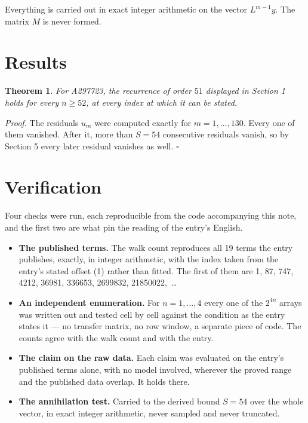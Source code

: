 \documentclass[11pt]{article}
\newtheorem{theorem}{Theorem}
\theoremstyle{definition}
\begin{document}
Everything is carried out in exact integer arithmetic on the vector $L^{m-1}y$. The matrix $M$ is never formed.

\section{Results}

\begin{theorem} For A297723, the recurrence of order $51$ displayed in Section 1 holds for every $n \ge 52$, at every index at which it can be stated.\end{theorem}

{\itshape Proof.} The residuals $u_m$ were computed exactly for $m = 1,\dots,130$. Every one of them vanished. After it, more than $S = 54$ consecutive residuals vanish, so by Section 5 every later residual vanishes as well. $\square$

\section{Verification}

Four checks were run, each reproducible from the code accompanying this note, and the first two are what pin the reading of the entry's English.

\begin{itemize}

\item {\bfseries The published terms.} The walk count reproduces all 19 terms the entry publishes, exactly, in integer arithmetic, with the index taken from the entry's stated offset (1) rather than fitted. The first of them are 1, 87, 747, 4212, 36981, 336653, 2699832, 21850022,~\dots

\item {\bfseries An independent enumeration.} For $n = 1,\dots,4$ every one of the $2^{4n}$ arrays was written out and tested cell by cell against the condition as the entry states it --- no transfer matrix, no row window, a separate piece of code. The counts agree with the walk count and with the entry.

\item {\bfseries The claim on the raw data.} Each claim was evaluated on the entry's published terms alone, with no model involved, wherever the proved range and the published data overlap. It holds there.

\item {\bfseries The annihilation test.} Carried to the derived bound $S = 54$ over the whole vector, in exact integer arithmetic, never sampled and never truncated.

\end{itemize}
\end{document}
